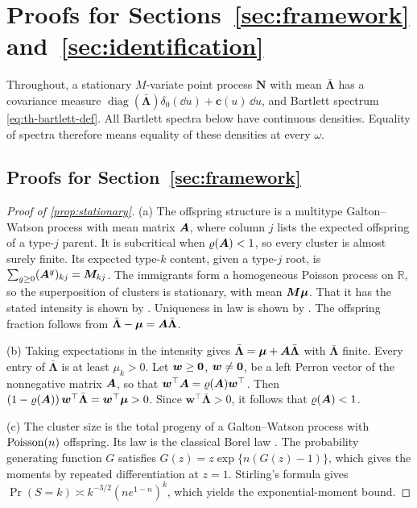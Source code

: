 \section{Proofs for Sections~\ref{sec:framework} and~\ref{sec:identification}}\label{app:idproofs}

Throughout, a stationary $M$-variate point process $\bm N$ with mean
$\bar{\bm\Lambda}$ has a covariance measure
$\operatorname{diag}(\bar{\bm\Lambda})\delta_0(\dd u)+\bm c(u)\,\dd u$, and Bartlett
spectrum \eqref{eq:th-bartlett-def}. All Bartlett spectra below have continuous
densities. Equality of spectra therefore means equality of these densities at every
$\omega$.

\subsection{Proofs for Section~\ref{sec:framework}}\label{app:fw-proofs}

\begin{proof}[Proof of \cref{prop:stationary}]
(a) The offspring structure is a multitype Galton--Watson process with mean matrix
$\bm{A}$, where column $j$ lists the expected offspring of a type-$j$ parent. It is
subcritical when $\varrho(\bm{A})<1$, so every cluster is almost surely finite. Its
expected type-$k$ content, given a type-$j$ root, is $\sum_{g\ge0}(\bm{A}^g)_{kj}=\bm{M}_{kj}$.
The immigrants form a homogeneous Poisson process on $\mathbb R$, so the
superposition of clusters is stationary, with mean $\bm{M}\bm\mu$. That it has the
stated intensity is shown by \citet{hawkes1974}. Uniqueness in law is shown by
\citet{bremaud1996}. The offspring fraction follows from
$\bar{\bm\Lambda}-\bm\mu=\bm{A}\bar{\bm\Lambda}$.

(b) Taking expectations in the intensity gives
$\bar{\bm\Lambda}=\bm\mu+\bm{A}\bar{\bm\Lambda}$ with $\bar{\bm\Lambda}$ finite.
Every entry of $\bar{\bm\Lambda}$ is at least $\mu_k>0$. Let $\bm w\ge\mathbf{0}$,
$\bm w\neq\mathbf{0}$, be a left Perron vector of the nonnegative matrix $\bm{A}$, so that
$\bm w^{\top}\bm{A}=\varrho(\bm{A})\bm w^{\top}$. Then
$(1-\varrho(\bm{A}))\,\bm w^{\top}\bar{\bm\Lambda}=\bm w^{\top}\bm\mu>0$. Since
$\bm w^{\top}\bar{\bm\Lambda}>0$, it follows that $\varrho(\bm{A})<1$.

(c) The cluster size is the total progeny of a Galton--Watson process with
$\operatorname{Poisson}(n)$ offspring. Its law is the classical Borel law
\citep[see][]{dwass1969}. The probability generating function $G$ satisfies
$G(z)=z\exp\{n(G(z)-1)\}$, which gives the moments by repeated differentiation at
$z=1$. Stirling's formula gives $\Pr(S=k)\asymp k^{-3/2}(ne^{1-n})^k$, which yields the
exponential-moment bound.
\end{proof}

